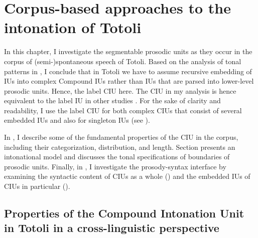\chapter[Corpus-based approaches]{Corpus-based approaches to the intonation of Totoli}
\label{sec:The IU in Totoli}






In this chapter, I investigate the segmentable prosodic units as they occur in the corpus of (semi-)spontaneous speech of Totoli. Based on the analysis of tonal patterns in , I conclude that in Totoli we have to assume recursive embedding  of IUs into complex Compound IUs  rather than IUs that are parsed into lower-level prosodic units. Hence,  the label CIU here. The CIU in my analysis is hence equivalent to the label IU in other studies  \citep[]{Croft_1995, Croft_2007, Tao_1996, Park_2002, Schuetze-Coburn1991, Schuetze-Coburn1994, Matsumoto_2003, Iwasaki1996Thai, IwasakiTao1993comparative, Wouk_2008}.  For the sake of clarity and readability, I use the label CIU for both complex CIUs that consist of several embedded IUs and also for singleton IUs (see ).



In  , I describe some of the fundamental properties of the CIU in the corpus, including their categorization, distribution, and length. Section  presents an intonational model  and discusses the tonal specifications of  boundaries of prosodic units. Finally, in , I investigate the prosody-syntax interface  by examining the syntactic content of CIUs as a whole () and the embedded IUs of CIUs in particular ().



\section[Properties of the CIU in Totoli in a cross-linguistic perspective]{Properties of the Compound Intonation Unit in Totoli in a cross-linguistic perspective}
\label{IU-Props}



